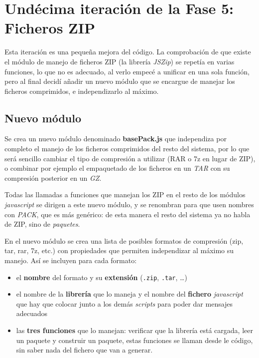 \section{Undécima iteración de la Fase 5: Ficheros ZIP}\label{sec:F5I11}

Esta iteración es una pequeña mejora del código. La comprobación de que existe el módulo de manejo de ficheros ZIP (la librería \emph{JSZip}) se repetía en varias funciones, lo que no es adecuado, al verlo empecé a unificar en una sola función, pero al final decidí añadir un nuevo módulo que se encargue de manejar los ficheros comprimidos, e independizarlo al máximo.

\subsection{Nuevo módulo}
\label{sec:F5I11Modulo}

Se crea un nuevo módulo denominado \textbf{basePack.js} que independiza por completo el manejo de los ficheros comprimidos del resto del sistema, por lo que será sencillo cambiar el tipo de compresión a utilizar (RAR o 7z en lugar de ZIP), o combinar por ejemplo el empaquetado de los ficheros en un \emph{TAR} con su compresión posterior en un \emph{GZ}.

Todas las llamadas a funciones que manejan los ZIP en el resto de los módulos \emph{javascript} se dirigen a este nuevo módulo, y se renombran para que usen nombres con \emph{PACK}, que es más genérico: de esta manera el resto del sistema ya no habla de ZIP, sino de \emph{paquetes}.

En el nuevo módulo se crea una lista de posibles formatos de compresión (zip, tar, rar, 7z, etc.) con propiedades que permiten independizar al máximo su manejo. Así se incluyen para cada formato:
\begin{itemize}
	\item el \textbf{nombre} del formato y su \textbf{extensión} (\texttt{.zip}, \texttt{.tar}, \dots)
	\item el nombre de la \textbf{librería} que lo maneja y el nombre del \textbf{fichero} \emph{javascript} que hay que colocar junto a los demás \emph{scripts} para poder dar mensajes adecuados
	\item las \textbf{tres funciones} que lo manejan: verificar que la librería está cargada, leer un paquete y construir un paquete, estas funciones se llaman desde le código, sin saber nada del fichero que van a generar.
\end{itemize}


